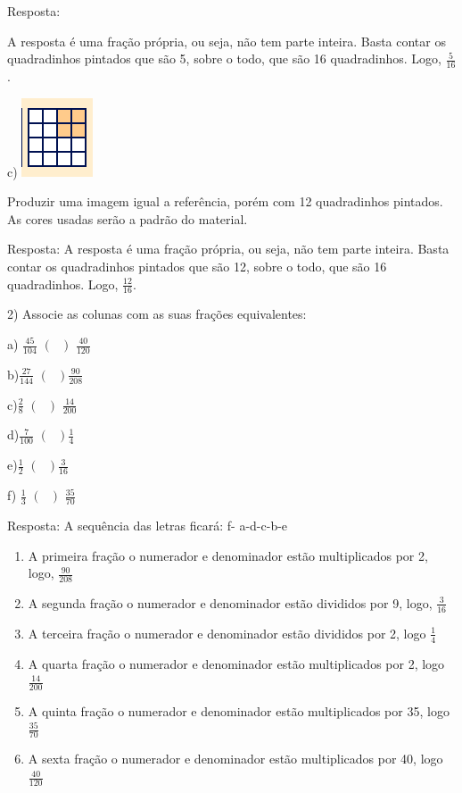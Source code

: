 {{{Resposta:

A resposta é uma fração própria, ou seja, não tem parte inteira. Basta
contar os quadradinhos pintados que são 5, sobre o todo, que são 16
quadradinhos. Logo, \(\frac{5}{16}\).

c)
\includegraphics[width=0.83333in,height=0.91667in]{./imgSAEB_7_MAT/media/image8.png}

Produzir uma imagem igual a referência, porém com 12 quadradinhos
pintados. As cores usadas serão a padrão do material.

Resposta: A resposta é uma fração própria, ou seja, não tem parte
inteira. Basta contar os quadradinhos pintados que são 12, sobre o todo,
que são 16 quadradinhos. Logo, \(\frac{12}{16}\).

2) Associe as colunas com as suas frações equivalentes:

a) \(\frac{45}{104}\) \(\left( \text{\ \ \ \ } \right)\)
\(\frac{40}{120}\)

b)\(\frac{27}{144}\) \(\left( \text{\ \ \ \ \ } \right)\frac{90}{208}\)

c)\(\frac{2}{8}\) \(\left( \text{\ \ \ \ \ \ } \right)\)
\(\frac{14}{200}\)

d)\(\frac{7}{100}\) \(\left( \text{\ \ \ \ \ \ } \right)\frac{1}{4}\)

e)\(\frac{1}{2}\) \(\left( \text{\ \ \ \ \ \ } \right)\frac{3}{16}\)

f) \(\frac{1}{3}\) \(\left( \text{\ \ \ \ \ \ \ } \right)\)
\(\frac{35}{70}\)

Resposta: A sequência das letras ficará: f- a-d-c-b-e

\begin{enumerate}
\def\labelenumi{\alph{enumi})}
\item
  A primeira fração o numerador e denominador estão multiplicados por 2,
  logo, \(\frac{90}{208}\)
\item
  A segunda fração o numerador e denominador estão divididos por 9,
  logo, \(\frac{3}{16}\)
\item
  A terceira fração o numerador e denominador estão divididos por 2,
  logo \(\frac{1}{4}\)
\item
  A quarta fração o numerador e denominador estão multiplicados por 2,
  logo \(\frac{14}{200}\)
\item
  A quinta fração o numerador e denominador estão multiplicados por 35,
  logo\(\frac{35}{70}\)
\item
  A sexta fração o numerador e denominador estão multiplicados por 40,
  logo \(\frac{40}{120}\)
\end{enumerate}

}}}
